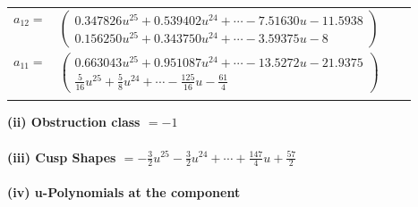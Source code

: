 \documentclass[1p]{elsarticle_modified}
\theoremstyle{definition}
\begin{document}
\begin{tabular}{m{7pt} m{180pt} m{7pt} m{180pt} }
\flushright $a_{12}=$&$\begin{pmatrix}0.347826 u^{25}+0.539402 u^{24}+\cdots-7.51630 u-11.5938\\0.156250 u^{25}+0.343750 u^{24}+\cdots-3.59375 u-8\end{pmatrix}$ \\
\flushright $a_{11}=$&$\begin{pmatrix}0.663043 u^{25}+0.951087 u^{24}+\cdots-13.5272 u-21.9375\\\frac{5}{16} u^{25}+\frac{5}{8} u^{24}+\cdots-\frac{125}{16} u-\frac{61}{4}\end{pmatrix}$\\&\end{tabular}
\flushleft \textbf{(ii) Obstruction class $= -1$}\\~\\
\flushleft \textbf{(iii) Cusp Shapes $= -\frac{3}{2} u^{25}-\frac{3}{2} u^{24}+\cdots+\frac{147}{4} u+\frac{57}{2}$}\\~\\
\newpage\renewcommand{\arraystretch}{1}
\flushleft \textbf{(iv) u-Polynomials at the component}\newline \\
\end{document}
